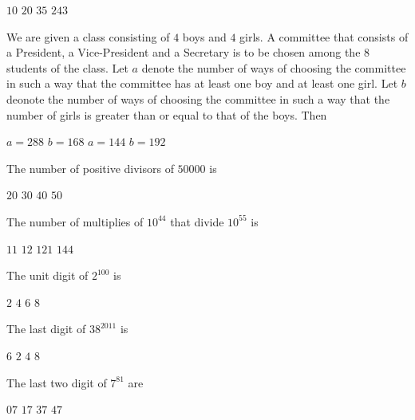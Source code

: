 \documentclass[10pt]{exam}
\begin{document}
\begin{questions}
\begin{oneparchoices}
\choice $10$ 
\choice $20$ 
\choice $35$ 
\choice $243$
\end{oneparchoices} 

\question 
We are given a class consisting of $4$ boys and $4$ girls. A committee that consists of a President, a Vice-President and a Secretary is to be chosen among the $8$ students of the class. Let $a$ denote the number of ways of choosing the committee in such a way that the committee has at least one boy and at least one girl. Let $b$ deonote the number of ways of choosing the committee in such a way that the number of girls is greater than or equal to that of the boys. Then 

\begin{oneparcheckboxes}
\choice $a = 288$ 
\choice $b = 168$ 
\choice $a = 144$ 
\choice $b = 192$
\end{oneparcheckboxes}
 
\question
The number of positive divisors of $50000$ is

\begin{oneparchoices}
\choice $20$
\choice $30$
\choice $40$
\choice $50$  
\end{oneparchoices}

\question 
The number of multiplies of $10^{44}$ that divide $10^{55}$ is 

\begin{oneparchoices}
\choice $11	$
\choice $12	$
\choice $121$
\choice $144$  
\end{oneparchoices}
\question
The unit digit of $2^{100}$ is

\begin{oneparchoices}
\choice $2$
\choice $4$
\choice $6$
\choice $8$
\end{oneparchoices}

\question
The last digit of $38^{2011}$ is

\begin{oneparchoices}
\choice $6$
\choice $2$
\choice $4$
\choice $8$  
\end{oneparchoices}

\question
The last two digit of $7^{81}$ are 

\begin{oneparchoices}
\choice $07$
\choice $17$
\choice $37$
\choice $47$  
\end{oneparchoices}


\end{questions}
\end{document}
